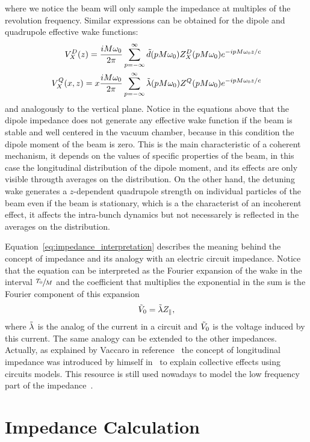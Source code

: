     where we notice the beam will only sample the impedance at multiples of the revolution frequency. Similar expressions can be obtained for the dipole and quadrupole effective wake functions:
    \begin{align}
  		V^D_X(z) = \frac{iM\omega_0}{2\pi} \sum_{p=-\infty}^\infty \tilde{d}(pM\omega_0)Z^D_X(pM\omega_0)e^{-ipM\omega_0 z/c}\\
		V^Q_X(x,z) = x\frac{iM\omega_0}{2\pi} \sum_{p=-\infty}^\infty \tilde{\lambda}(pM\omega_0)Z^Q(pM\omega_0)e^{-ipM\omega_0 z/c}
    \end{align}
    and analogously to the vertical plane. Notice in the equations above that the dipole impedance does not generate any effective wake function if the beam is stable and well centered in the vacuum chamber, because in this condition the dipole moment of the beam is zero. This is the main characteristic of a coherent mechanism, it depends on the values of specific properties of the beam, in this case the longitudinal distribution of the dipole moment, and its effects are only visible througth averages on the distribution. On the other hand, the detuning wake generates a $z$-dependent quadrupole strength on individual particles of the beam even if the beam is stationary, which is a the characterist of an incoherent effect, it affects the intra-bunch dynamics but not necessarely is reflected in the averages on the distribution.

    Equation~\eqref{eq:impedance_interpretation} describes the meaning behind the concept of impedance and its analogy with an electric circuit impedance. Notice that the equation can be interpreted as the Fourier expansion of the wake in the interval $\sfrac{T_0}{M}$ and the coefficient that multiplies the exponential in the sum is the Fourier component of this expansion
    \begin{align}
  	  	\tilde{V}_0 = \tilde{\lambda}Z_\parallel,
    \end{align}
    where $\tilde{\lambda}$ is the analog of the current in a circuit and $\tilde{V}_0$ is the voltage induced by this current. The same analogy can be extended to the other impedances. Actually, as explained by Vaccaro in reference~\cite{vaccaro_novo} the concept of longitudinal impedance was introduced by himself in~\cite{vaccaro_velho} to explain collective effects using circuits models. This resource is still used nowadays to model the low frequency part of the impedance~\cite{davino, zotter}.

\section{Impedance Calculation}

